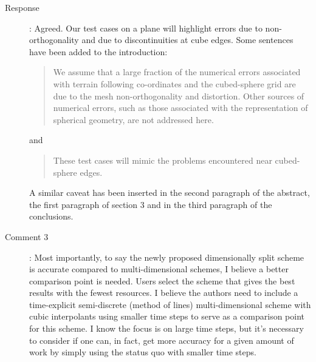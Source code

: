 \documentclass[12pt]{article}
\begin{document}
\begin{description}
\item [Response]:
Agreed. Our test cases on a plane will highlight errors due to non-orthogonality and due to discontinuities at cube edges. Some sentences have been added to the introduction:
\begin{quote}
We assume that a large fraction of the numerical errors associated with terrain following co-ordinates and the cubed-sphere grid are due to the mesh non-orthogonality and distortion. Other sources of numerical errors, such as those associated with the representation of spherical geometry, are not addressed here.
\end{quote}
and
\begin{quote}
These test cases will mimic the problems encountered near cubed-sphere edges. 
\end{quote}
A similar caveat has been inserted in the second paragraph of the abstract, the first paragraph of section 3 and in the third paragraph of the conclusions. 

\item [Comment 3]: Most importantly, to say the newly proposed dimensionally split scheme is accurate compared to multi-dimensional schemes, I believe a better comparison point is needed. Users select the scheme that gives the best results with the fewest resources. I believe the authors need to include a time-explicit semi-discrete (method of lines) multi-dimensional scheme with cubic interpolants using smaller time steps to serve as a comparison point for this scheme. I know the focus is on large time steps, but it's necessary to consider if one can, in fact, get more accuracy for a given amount of work by simply using the status quo with smaller time steps. 


\end{description}
\end{document}
